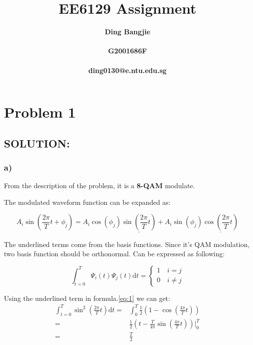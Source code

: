 \documentclass{article}
\title{EE6129 Assignment \uppercase\expandafter{\romannumeral2}}
\author{\bf{Ding Bangjie} \\
\\
G2001686F \\
\\
ding0130@e.ntu.edu.sg}
\date{}
\begin{document}
\maketitle

\section{Problem 1}
\subsection*{SOLUTION:}
\subsubsection*{a)}
\par From the description of the problem, it is a \textbf{8-QAM} modulate.
\par The modulated waveform function can be expanded as:

\begin{equation}\label{eq:1}
 A_i\sin(\frac{2\pi}{T}t + \phi_j) = A_i\cos(\phi_j)\underline{\sin(\frac{2\pi}{T}t)} + A_i\sin(\phi_j)\underline{\cos(\frac{2\pi}{T}t)}
\end{equation}

\par The underlined terms come from the basis functions. Since it's QAM modulation, two basis function should be orthonormal. Can be expressed as following:

\begin{equation}\label{eq:2}
\int_{t=0}^T\Psi_i(t)\Psi_j(t)\mathrm{d}t = \left\{  
\begin{aligned}
1 \quad i = j \\
0 \quad i \neq j
\end{aligned}
\right.  
\end{equation}

\par Using the underlined term in formula.\ref{eq:1} we can get:
\begin{equation}\label{eq:3}
\begin{split}
\int_{t=0}^{T}\sin^{2}(\frac{2\pi}{T}t) \mathrm{d}t = & \int_{0}^{T}\frac{1}{2}(1-\cos(\frac{4\pi}{T}t))  \\
= & \frac{1}{2}(t - \frac{T}{4\pi}\sin(\frac{4\pi}{T}t))\bigg|_{0}^{T} \\
= & \frac{T}{2}
\end{split}
\end{equation}
\end{document}
